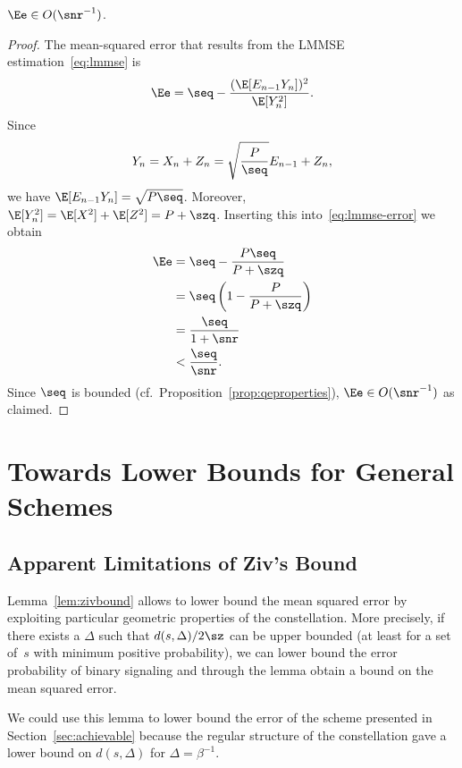 \begin{lemma}
  \label{lem:eedecay}
  $\Ee \in O(\snr^{-1})$. 
\end{lemma}
\begin{proof}
  The mean-squared error that results from the LMMSE estimation~\eqref{eq:lmmse}
  is
  \begin{equation}
    \label{eq:lmmse-error}
    \Ee = \seq - \frac{(\E[E_{n-1}
    Y_n])^2}{\E[Y_n^2]}. 
  \end{equation}
  Since
  \begin{equation*}
    Y_n = X_n + Z_n = \sqrt{\frac{P}{\seq}} E_{n-1} + Z_n,
  \end{equation*}
  we have $\E[E_{n-1}Y_n] = \sqrt{P\seq}$. Moreover, $\E[Y_n^2] = \E[X^2] +
  \E[Z^2] = P+\szq$.  Inserting this into~\eqref{eq:lmmse-error} we obtain
  \begin{align*}
    \Ee &= \seq - \frac{P \seq}{P + \szq} \\
    &= \seq \left( 1 - \frac{P}{P + \szq} \right) \\
    &= \frac{\seq}{1 + \snr} \\
    & < \frac{\seq}{\snr}.
  \end{align*}
  Since $\seq$ is bounded (cf.\ Proposition~\ref{prop:qeproperties}), 
  $\Ee \in O(\snr^{-1})$ as claimed.

\end{proof}


\section{Towards Lower Bounds for General Schemes}

\subsection{Apparent Limitations of Ziv's Bound}

Lemma~\ref{lem:zivbound} allows to lower bound the mean squared error by
exploiting particular geometric properties of the constellation. More precisely,
if there exists a $\Delta$ such that $d(s, \Delta)/2\sz$ can be upper bounded
(at least for a set of~$s$ with minimum positive probability), we can lower
bound the error probability of binary signaling and through the lemma obtain a
bound on the mean squared error.

We could use this lemma to lower bound the error of the scheme presented in
Section~\ref{sec:achievable} because the regular structure of the constellation
gave a lower bound on $d(s,\Delta)$ for $\Delta = \beta^{-1}$. 

